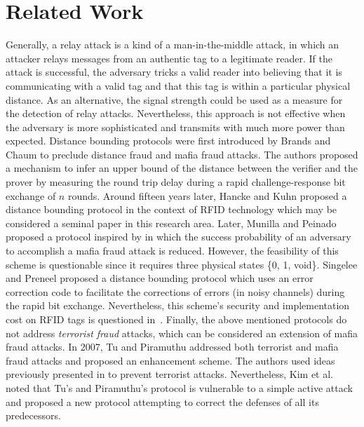 \documentclass{article}
\begin{document}
\section{Related Work}
Generally, a relay attack is a kind of a man-in-the-middle attack, in which an attacker relays messages from an authentic tag to a legitimate reader. If the attack is successful, the adversary tricks a valid reader into believing that it is communicating with a valid tag and that this tag is within a particular physical distance. As an alternative, the signal strength could be used as a measure for the detection of relay attacks. Nevertheless, this approach is not effective when the adversary is more sophisticated and transmits with much more power than expected. Distance bounding protocols were  first introduced by Brands and Chaum \cite{brands94} to preclude distance fraud and mafia fraud attacks. The authors proposed a mechanism to infer an upper bound of the distance between the verifier and the prover by measuring the round trip delay during a rapid challenge-response bit exchange of $n$ rounds.  Around fifteen years later, Hancke and Kuhn \cite{hancke05} proposed a distance bounding protocol in the context of RFID technology which may be considered a seminal paper in this research area. Later, Munilla and Peinado \cite{munilla2} proposed a protocol inspired by \cite{hancke05} in which the success probability of an adversary to accomplish a mafia fraud attack is reduced. However, the feasibility of this scheme is questionable since it requires three physical states \{0, 1, void\}.  Singelee and Preneel \cite{singeleep07} proposed a distance bounding protocol which uses an error correction code to facilitate the corrections of errors (in noisy channels) during the rapid bit exchange. Nevertheless, this scheme's security and implementation cost on RFID tags is questioned in~\cite{MunillaP-2010-elseviercc}. Finally, the above mentioned protocols do not address {\em terrorist fraud} attacks, which can be considered an extension of mafia fraud attacks.  In 2007, Tu and Piramuthu \cite{TuP-2007-rfidtechnology} addressed both terrorist and mafia fraud attacks and proposed an enhancement scheme. The authors used ideas previously presented in \cite{reid2007} to prevent terrorist attacks.  Nevertheless, Kim et al. \cite{KimAKSP-2008-icisc} noted that Tu's and Piramuthu's protocol is vulnerable to a simple active attack and proposed a new protocol attempting to correct the defenses of all its predecessors.\\
\end{document}
